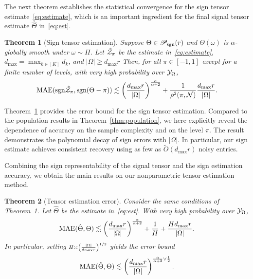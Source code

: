 \documentclass[11pt]{article}
\theoremstyle{plain}
\newtheorem{thm}{Theorem}
\theoremstyle{definition}
\def\sign{\textup{sgn}}
\def\caliP{\mathscr{P}_{\textup{sgn}}}
\begin{document}
The next theorem establishes the statistical convergence for the sign tensor estimate~\eqref{eq:estimate}, which is an important ingredient for the final signal tensor estimate $\hat \Theta$ in~\eqref{eq:est}. \\

 \begin{thm}[Sign tensor estimation]\label{thm:classification} Suppose $\Theta\in\caliP(r)$ and $\Theta(\omega)$ is $\alpha$-globally smooth under $\omega\sim \Pi$. Let $\hat {\mathcal{Z}}_\pi$ be the estimate in~\eqref{eq:estimate}, $d_{\max}=\max_{k\in[K]} d_k$, and $|\Omega|\geq d_{\max}r$ Then, for all $\pi\in[-1,1]$ except for a finite number of levels, with very high probability over $\mathcal{Y}_\Omega$, 
\begin{align}\label{eq:bound}
\textup{MAE}(\sign \hat \tZ_\pi, \sign(\Theta-\pi)) \lesssim  \left({d_{\max} r\over |\Omega|}\right)^{\alpha\over \alpha+2}+{1 \over \rho^2(\pi, \tN)} {d_{\max}r \over |\Omega|}.
\end{align}
\end{thm}
Theorem~\ref{thm:classification} provides the error bound for the sign tensor estimation. Compared to the population results in Theorem~\ref{thm:population}, we here explicitly reveal the dependence of accuracy on the sample complexity and on the level $\pi$. The result demonstrates the polynomial decay of sign errors with $|\Omega|$. In particular, our sign estimate achieves consistent recovery using as few as $\tilde O(d_{\max}r)$ noisy entries. 

Combining the sign representability of the signal tensor and the sign estimation accuracy, we obtain the main results on our nonparametric tensor estimation method.\\

\begin{thm}[Tensor estimation error]\label{thm:estimation} Consider the same conditions of Theorem~\ref{thm:classification}. Let $\hat \Theta$ be the estimate in~\eqref{eq:est}. With very high probability over $\mathcal{Y}_\Omega$,
\begin{equation}\label{eq:bound2}
\textup{MAE}(\hat \Theta, \Theta)\lesssim \left({d_{\max} r \over |\Omega|}\right)^{\alpha\over\alpha+2}+{1\over H}+{Hd_{\max} r \over |\Omega|}.
\end{equation}
In particular, setting $\scriptstyle H\asymp \left( |\Omega|\over d_{\max}r\right)^{1/2}$ yields the error bound
\begin{equation}\label{eq:real}
\textup{MAE}(\hat \Theta, \Theta)\lesssim \left(d_{\max}r \over |\Omega|\right)^{{\alpha \over \alpha+2} \vee {1\over 2}}.
\end{equation}
\end{thm}
\end{document}
